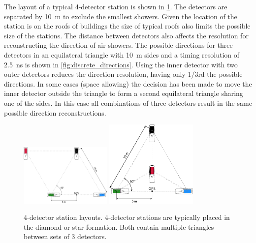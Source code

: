 The layout of a typical 4-detector station is shown in \cref{fig:4_detector_layouts}. The detectors are separated by \SI{10}{\meter} to exclude the smallest showers. Given the location of the station is on the roofs of buildings the size of typical roofs also limits the possible size of the stations. The distance between detectors also affects the resolution for reconstructing the direction of air showers. The possible directions for three detectors in an equilateral triangle with \SI{10}{\meter} sides and a timing resolution of \SI{2.5}{\ns} is shown in \cref{fig:discrete_directions}. Using the inner detector with two outer detectors reduces the direction resolution, having only 1/3rd the possible directions. In some cases (space allowing) the decision has been made to move the inner detector outside the triangle to form a second equilateral triangle sharing one of the sides. In this case all combinations of three detectors result in the same possible direction reconstructions.

\begin{figure}
    \centering
    \includegraphics[width=0.4\textwidth]
                    {plots/experiment/4_detector_diamond}
    \includegraphics[width=0.4\textwidth]
                    {plots/experiment/4_detector_star}
    \caption{4-detector station layouts. 4-detector stations are typically placed in the diamond or star formation. Both contain multiple triangles between sets of 3 detectors.}
    \label{fig:4_detector_layouts}
\end{figure}

